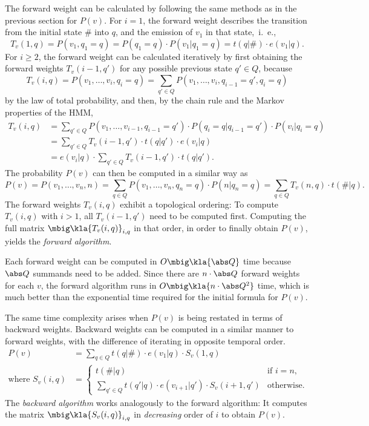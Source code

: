 The forward weight can be calculated by following the same methods as in the
previous section for $P(v)$. For $i = 1$, the forward weight describes the
transition from the initial state $\#$ into $q$, and the emission of $v_1$ in
that state,~i.~e.,
\begin{equation}\label{eq:03-T_v-base}
 T_v(1,q) = P(v_1,q_1=q) = P(q_1=q) \cdot P(v_1|q_1=q) = t(q|\#) \cdot e(v_1|q).
\end{equation}
For $i\geq 2$, the forward weight can be calculated iteratively by first
obtaining the forward weights $T_v(i-1,q')$ for any possible previous state
$q'\in Q$, because
\[
 T_v(i,q) = P(v_1,\ldots,v_i,q_i=q) = \sum_{q'\in Q} P(v_1,\ldots,v_i,q_{i-1}=q',q_i=q)
\]
by the law of total probability, and then, by the chain rule and the Markov
properties of the HMM,
\begin{align}
 T_v(i,q)
  &= \sum_{q'\in Q} P(v_1,\ldots,v_{i-1},q_{i-1}=q') \cdot P(q_i=q|q_{i-1}=q') \cdot P(v_i|q_i=q) \nonumber\\
  &= \sum_{q'\in Q} T_v(i-1,q') \cdot t(q|q') \cdot e(v_i|q) \nonumber\\
  &= e(v_i|q) \cdot \sum_{q'\in Q} T_v(i-1,q') \cdot t(q|q'). \label{eq:03-T_v}
\end{align}
The probability $P(v)$ can then be computed in a similar way as
\begin{equation}\label{eq:03-p-by-t}
 P(v) = P(v_1,\ldots,v_n,n) = \sum_{q\in Q} P(v_1,\ldots,v_n,q_n=q) \cdot P(n|q_n=q) = \sum_{q\in Q} T_v(n,q) \cdot t(\#|q).
\end{equation}
The forward weights $T_v(i,q)$ exhibit a topological ordering: To compute
$T_v(i,q)$ with $i>1$, all $T_v(i-1,q')$ need to be computed first. Computing
the full matrix $\mbig\kla{T_v(i,q)}_{i,q}$ in that order, in order to finally
obtain $P(v)$, yields the \emph{forward algorithm}.

Each forward weight can be computed in $O\mbig\kla{\abs Q}$ time because $\abs
Q$ summands need to be added. Since there are $n\cdot\abs Q$ forward weights
for each $v$, the forward algorithm runs in $O\mbig\kla{n \cdot \abs Q^2}$
time, which is much better than the exponential time required for the initial
formula for $P(v)$.

The same time complexity arises when $P(v)$ is being restated in terms of
backward weights. Backward weights can be computed in a similar manner to
forward weights, with the difference of iterating in opposite temporal order.
\begin{align}
 P(v) &= \sum_{q\in Q} t(q|\#) \cdot e(v_1|q) \cdot S_v(1,q) \label{eq:03-p-by-s} \\
 \text{where } S_v(i,q) &= \begin{cases}
  t(\#|q) & \text{if }i=n, \\
  \sum_{q'\in Q} t(q'|q) \cdot e(v_{i+1}|q') \cdot S_v(i+1,q') & \text{otherwise}.
 \end{cases} \label{eq:03-S_v}
\end{align}
The \emph{backward algorithm} works analogously to the forward algorithm: It
computes the matrix $\mbig\kla{S_v(i,q)}_{i,q}$ in \emph{decreasing} order of
$i$ to obtain $P(v)$.

